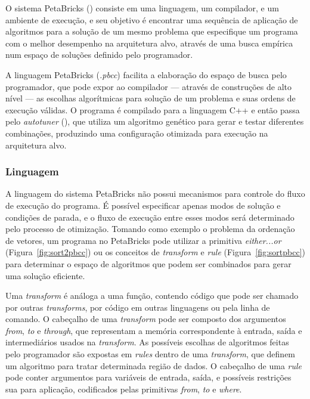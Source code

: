 \documentclass[a4paper, 11pt]{article}
\begin{document}
O sistema PetaBricks (\citet{ansel2009petabricks, ansel2014phd, 
ansel:xrds:2010, mitcsail-tr:2014})
consiste em uma linguagem, um compilador, e um ambiente de execução,
e seu objetivo é encontrar uma sequência de aplicação de algoritmos 
para a solução de um mesmo problema que especifique um programa com o melhor 
desempenho na arquitetura alvo, através de uma busca empírica num espaço
de soluções definido pelo programador.

A linguagem PetaBricks (\emph{.pbcc}) facilita a 
elaboração do espaço de busca pelo programador, que pode expor ao compilador 
--- através de construções de alto nível --- as escolhas algorítmicas 
para solução de um problema e suas ordens de execução válidas. O programa é 
compilado para a linguagem C++ e então passa pelo \emph{autotuner} 
(\citet{ansel2011efficient}), que utiliza um algoritmo genético para gerar e 
testar diferentes combinações, produzindo uma configuração otimizada para 
execução na arquitetura alvo.

\subsubsection{Linguagem}

A linguagem do sistema PetaBricks não possui mecanismos para controle do fluxo
de execução do programa. É possível especificar apenas modos de solução e 
condições de parada, e o fluxo de execução entre esses modos será determinado 
pelo processo de otimização.
Tomando como exemplo o problema da ordenação de vetores, um programa no
PetaBricks pode utilizar a primitiva \emph{either...or} 
(Figura~\ref{fig:sort2pbcc}) ou os conceitos de \emph{transform} e \emph{rule}
(Figura~\ref{fig:sortpbcc}) para determinar o espaço de algoritmos que podem 
ser combinados para gerar uma solução eficiente.

Uma \emph{transform} é análoga a uma função, contendo código que pode
ser chamado por outras \emph{transforms}, por código em outras linguagens
ou pela linha de comando. O cabeçalho de uma \emph{transform} pode ser composto
dos argumentos \emph{from}, \emph{to} e \emph{through}, que representam a
memória correspondente à entrada, saída e intermediários usados na 
\emph{transform}.
As possíveis escolhas de algoritmos feitas pelo programador são expostas 
em \emph{rules} dentro de uma \emph{transform}, que definem um algoritmo
para tratar determinada região de dados. O cabeçalho de uma \emph{rule} pode
conter argumentos para variáveis de entrada, saída, e possíveis restrições sua 
para aplicação, codificados pelas primitivas \emph{from}, \emph{to} e 
\emph{where}.
\end{document}
